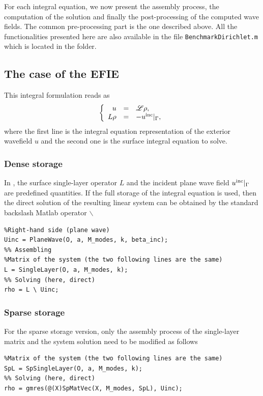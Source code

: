 For each integral equation, we now present the assembly process, the computation of the solution and finally the post-processing of the computed wave
fields. 
The common pre-processing part is the one described above. All the functionalities presented here are also available in  the
 file \texttt{BenchmarkDirichlet.m} which is located in the   folder.

\subsection{The case of the EFIE}


This integral formulation reads as
$$
\left\{\begin{array}{r c l}
u &=& {\mathscr L}\rho,\\
L\rho &=& -u^{\textrm{inc}}|_{\Gamma},
\end{array}\right.
$$
where the first line is the integral equation representation of the exterior wavefield $u$ and the second one is  the surface 
integral equation to solve. 

\subsubsection{Dense storage}

In \mudiff, the surface single-layer operator $L$ and the incident plane wave field $u^{\textrm{inc}}|_{\Gamma}$ are  predefined quantities.
If the full storage of the integral equation is used, then the direct solution of the resulting linear system can be
obtained by the standard backslash Matlab operator $\backslash$ 
\begin{lstlisting}
%Right-hand side (plane wave)
Uinc = PlaneWave(O, a, M_modes, k, beta_inc);
%% Assembling
%Matrix of the system (the two following lines are the same)
L = SingleLayer(O, a, M_modes, k);
%% Solving (here, direct)
rho = L \ Uinc;
\end{lstlisting}
\medskip

\subsubsection{Sparse storage}

For the sparse storage version, only the assembly process of the single-layer matrix and the system solution
need to be modified as follows
\begin{lstlisting}
%Matrix of the system (the two following lines are the same)
SpL = SpSingleLayer(O, a, M_modes, k);
%% Solving (here, direct)
rho = gmres(@(X)SpMatVec(X, M_modes, SpL), Uinc);
\end{lstlisting}
\medskip

